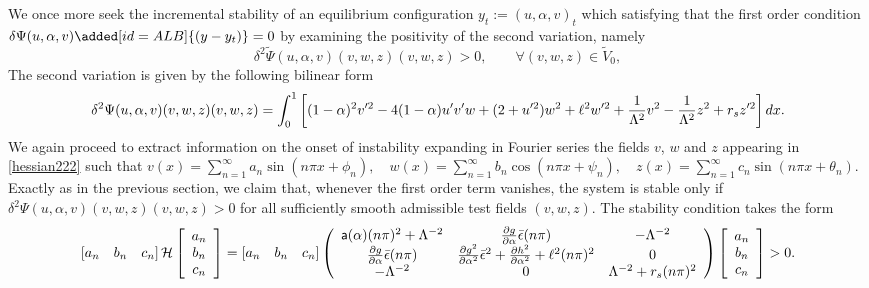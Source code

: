 We once more seek the incremental stability of an equilibrium configuration $y_t := (u, \alpha,  v)_t$ which satisfying that the first order condition $\delta \Psi(u,\alpha, v)\added[id=ALB]{(y-y_t)}=0$  by examining the positivity of the second variation, namely
\begin{equation*}
\delta^2 \widetilde\Psi(u,\alpha, v)(v,w,z)(v,w,z)>0, \qquad \forall (v,w,z)\in \widetilde V_0,
\end{equation*}The second variation is given by the following bilinear form 
\begin{equation}
\delta^2 \Psi(u,\alpha, v)(v,w,z)(v,w,z)=\int_0^1 \left[(1-\alpha)^2v'^2 
- 4(1-\alpha)u' v'w+(2+ u'^2)w^2+\ell^2w'^2 +\frac{1}{\Lambda^2} v^2 -\frac{1}{\Lambda^2} z^2+r_sz'^2\right]dx.\label{hessian222}\end{equation}
We again proceed to extract information on the onset of instability expanding in Fourier series the fields $v$, $w$ and $z$ appearing in \eqref{hessian222} such that $v(x)=\sum_{n=1}^{\infty} a_{n} \sin \left(n \pi x+\phi_{n}\right), \quad w(x)=\sum_{n=1}^{\infty} b_{n} \cos \left(n \pi x+\psi_{n}\right),\quad z(x)=\sum_{n=1}^{\infty} c_{n} \sin \left(n \pi x+\theta_{n}\right)$. Exactly as in the previous section, we claim that, whenever the first order term vanishes, the system is stable only if $\delta^2 \Psi(u,\alpha, v)(v,w,z)(v,w,z)>0$ for all sufficiently smooth admissible test fields $(v, w, z)$. The stability condition  takes the form
\begin{align}\left[ a_n \quad b_n \quad c_n  \right] \mathcal{H} \left[ \begin{array}{c} a_n \\ b_n  \\ c_n\end{array} \right]=\left[ a_n \quad b_n \quad c_n \right]\left(
\begin{array}{ccc}
\mathsf{a}(\alpha)(n\pi)^2+\Lambda^{-2}& \frac{\partial g}{\partial \alpha}\bar\epsilon(n\pi) &  -\Lambda^{-2} \\
\frac{\partial g}{\partial \alpha}\bar\epsilon(n\pi) & \frac{\partial g^2}{\partial \alpha^2}\bar\epsilon^2+ \frac{\partial h^2}{\partial \alpha^2}+\ell^2(n\pi)^2 & 0 \\
 -\Lambda^{-2} & 0 & \Lambda^{-2} +r_s(n\pi)^2\\
\end{array}
\right)\left[ \begin{array}{c} a_n \\ b_n \\c_n \end{array} \right]>0.\label{hessian3}\end{align}
